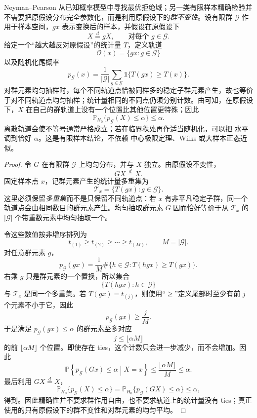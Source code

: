 \begin{theorem}[有限群不变性下的精确检验]
Neyman--Pearson 从已知概率模型中寻找最优拒绝域；另一类有限样本精确检验并不需要把原假设分布完全参数化，而是利用原假设下的\emph{群不变性}。设有限群 $\mathcal G$ 作用于样本空间，$g x$ 表示变换后的样本，并假设在原假设下
\begin{equation}\label{eq:math-stat-group-invariance-null}
 X\overset{d}=gX,
 \qquad
 \text{对每个 }g\in\mathcal G.
\end{equation}
给定一个“越大越反对原假设”的统计量 $T$，定义轨道
\[
 \mathcal O(x)=\{gx:g\in\mathcal G\}
\]
以及随机化尾概率
\begin{equation*}p_{\mathcal G}(x)
 =\frac{1}{|\mathcal G|}
 \sum_{g\in\mathcal G}
 \mathds{1}\{T(gx)\ge T(x)\}.
\end{equation*}
对群元素均匀抽样时，每个不同轨道点恰被同样多的稳定子群元素产生，故也等价于对不同轨道点均匀抽样；统计量相同的不同点仍须分别计数。由可知，在原假设下，$X$ 在自己的群轨道上没有一个位置比其他位置更特殊；因此
\begin{equation}\label{eq:math-stat-randomization-validity}
 \mathbb P_{H_0}\{p_{\mathcal G}(X)\le\alpha\}
 \le\alpha.
\end{equation}
离散轨道会使不等号通常严格成立；若在临界秩处再作适当随机化，可以把 水平 调到恰好 $\alpha$。这是有限样本结论，不依赖 中心极限定理、Wilks 或大样本正态近似。
\end{theorem}

\begin{proof}
令 $G$ 在有限群 $\mathcal G$ 上均匀分布，并与 $X$ 独立。由原假设不变性，
\[
 GX\overset{d}=X.
\]
固定样本点 $x$，记群元素产生的统计量多重集为
\[
 \mathcal T_x=\{T(gx):g\in\mathcal G\}.
\]
这里必须保留\emph{多重集}而不是只保留不同轨道点：若 $x$ 有非平凡稳定子群，同一个轨道点会由相同数目的群元素产生。均匀抽取群元素 $G$ 因而恰好等价于从 $\mathcal T_x$ 的 $|\mathcal G|$ 个带重数元素中均匀抽取一个。

令这些数值按非增序排列为
\[
 t_{(1)}\ge t_{(2)}\ge\cdots\ge t_{(M)},
 \qquad M=|\mathcal G|.
\]
对任意群元素 $g$，
\[
 p_{\mathcal G}(gx)
 =\frac1M\#\{h\in\mathcal G:T(hgx)\ge T(gx)\}.
\]
右乘 $g$ 只是群元素的一个置换，所以集合
\[
 \{T(hgx):h\in\mathcal G\}
\]
与 $\mathcal T_x$ 是同一个多重集。若 $T(gx)=t_{(j)}$，则使用“$\ge$”定义尾部时至少有前 $j$ 个元素不小于它，因此
\[
 p_{\mathcal G}(gx)\ge\frac{j}{M}.
\]
于是满足 $p_{\mathcal G}(gx)\le\alpha$ 的群元素至多对应
\[
 j\le \lfloor \alpha M\rfloor
\]
的前 $\lfloor\alpha M\rfloor$ 个位置。即使存在 ties，这个计数只会进一步减少，而不会增加。因此
\[
 \mathbb P\!\left\{
 p_{\mathcal G}(Gx)\le\alpha
 \middle|X=x
 \right\}
 \le
 \frac{\lfloor\alpha M\rfloor}{M}
 \le\alpha.
\]
最后利用 $GX\overset d=X$，
\[
 \mathbb P_{H_0}\{p_{\mathcal G}(X)\le\alpha\}
 =
 \mathbb P_{H_0}\{p_{\mathcal G}(GX)\le\alpha\}
 \le\alpha,
\]
得到。因此精确性并不要求群作用自由，也不要求轨道上的统计量没有 ties；真正使用的只有原假设下的群不变性和对群元素的均匀平均。
\end{proof}


